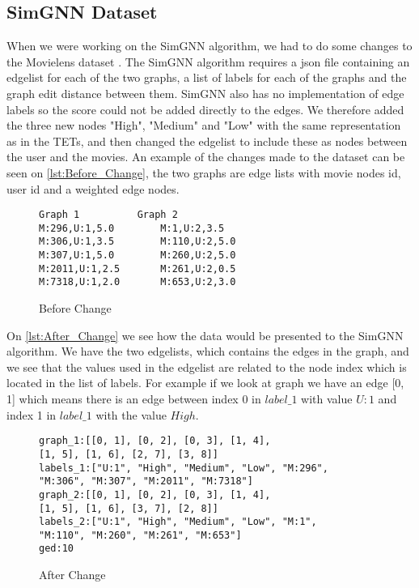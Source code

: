 \subsection{SimGNN Dataset}
When we were working on the SimGNN algorithm, we had to do some changes to the Movielens dataset \cite{Grouplensdata}. The SimGNN algorithm requires a json file containing an edgelist for each of the two graphs, a list of labels for each of the graphs and the graph edit distance between them. SimGNN also has no implementation of edge labels so the score could not be added directly to the edges. We therefore added the three new nodes "High", "Medium" and "Low" with the same representation as in the TETs, and then changed the edgelist to include these as nodes between the user and the movies. 
An example of the changes made to the dataset can be seen on \autoref{lst:Before_Change}, the two graphs are edge lists with movie nodes id, user id and a weighted edge nodes. 
\begin{figure}[H]
\begin{lstlisting}
Graph 1			 Graph 2
M:296,U:1,5.0		 M:1,U:2,3.5
M:306,U:1,3.5		 M:110,U:2,5.0
M:307,U:1,5.0		 M:260,U:2,5.0
M:2011,U:1,2.5 		 M:261,U:2,0.5
M:7318,U:1,2.0		 M:653,U:2,3.0
\end{lstlisting}
\caption{Before Change}
\label{lst:Before_Change}
\end{figure}
On \autoref{lst:After_Change} we see how the data would be presented to the SimGNN algorithm. We have the two edgelists, which contains the edges in the graph, and we see that the values used in the edgelist are related to the node index which is located in the list of labels. For example if we look at graph we have an edge [0, 1] which means there is an edge between index 0 in $label\_1$ with value $U:1$ and index 1 in $label\_1$ with the value  $High$.
\begin{figure}[H]
\begin{lstlisting}
graph_1:[[0, 1], [0, 2], [0, 3], [1, 4], 
[1, 5], [1, 6], [2, 7], [3, 8]]
labels_1:["U:1", "High", "Medium", "Low", "M:296", 
"M:306", "M:307", "M:2011", "M:7318"]
graph_2:[[0, 1], [0, 2], [0, 3], [1, 4], 
[1, 5], [1, 6], [3, 7], [2, 8]]
labels_2:["U:1", "High", "Medium", "Low", "M:1",
"M:110", "M:260", "M:261", "M:653"]
ged:10
\end{lstlisting}
\caption{After Change}
\label{lst:After_Change}
\end{figure}
